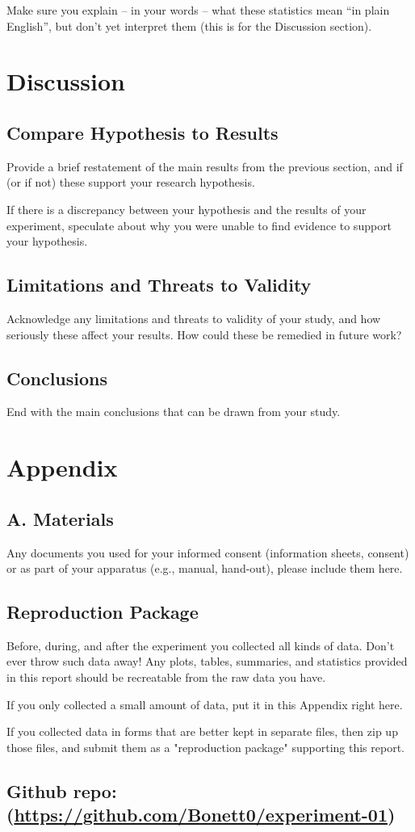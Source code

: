 \documentclass{article}
\begin{document}
Make sure you explain – in your words – what these statistics mean “in plain English”, but don’t yet interpret them (this is for the Discussion section).


\section{Discussion}
\subsection{Compare Hypothesis to Results}
Provide a brief restatement of the main results from the previous section, and if (or if not) these support your research hypothesis.

If there is a discrepancy between your hypothesis and the results of your experiment, speculate about why you were unable to find evidence to support your hypothesis.


\subsection{Limitations and Threats to Validity}Acknowledge any limitations and threats to validity of your study, and how seriously these affect your results. How could these be remedied in future work?

\subsection{Conclusions}

End with the main conclusions that can be drawn from your study.


\section{Appendix}
\subsection*{A. Materials}

Any documents you used for your informed consent (information sheets, consent) or as part of your apparatus (e.g., manual, hand-out), please include them here.

\subsection{Reproduction Package}

Before, during, and after the experiment you collected all kinds of data. Don't ever throw such data away! Any plots, tables, summaries, and statistics provided in this report should be recreatable from the raw data you have.

If you only collected a small amount of data, put it in this Appendix right here.

If you collected data in forms that are better kept in separate files, then zip up those files, and submit them as a "reproduction package" supporting this report.


\subsection*{{Github repo: (\url{https://github.com/Bonett0/experiment-01})}}
\end{document}
